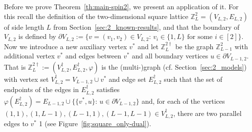 \documentclass{dis}
\theoremstyle{citing}
\begin{document}
Before we prove Theorem~\ref{th:main-spin2}, we present an 
application of it.
For this recall the definition of the two-dimensional 
square lattice ${\ensuremath{\mathbb{Z}}}_L^2=(V_{L,2},E_{L,2})$ of side length $L$ 
from Section~\ref{sec:2_known-results}, 
and that the boundary of $V_{L,2}$ is defined by 
$\partial V_{L,2} := \bigl\{v=(v_1,v_2)\in V_{L,2}:\, 
v_i\in\{1,L\} \text{ for some } i\in[2]\bigr\}$. 
Now we introduce a new auxiliary vertex $v^*$ and 
let ${\ensuremath{\mathbb{Z}}}_L^{2\dag}$ be the graph ${\ensuremath{\mathbb{Z}}}_{L-1}^2$ with additional 
vertex $v^*$ and edges between $v^*$ and all boundary vertices 
$u\in\partial V_{L-1,2}$.
That is ${\ensuremath{\mathbb{Z}}}_L^{2\dag}:=(V_{L,2}^\dag,E_{L,2}^\dag,\varphi)$ 
is the (multi-)graph (cf. Section~\ref{sec:2_models}) with 
vertex set $V_{L,2}^\dag=V_{L-1,2}\cup v^*$ and edge set 
$E_{L,2}^\dag$ such that
the set of endpoints of the edges in $E_{L,2}^\dag$ satisfies 
$\varphi(E_{L,2}^\dag)=
E_{L-1,2}\cup\{\{v^*,u\}:\,u\in\partial V_{L-1,2}\}$ 
and, 
for each of the vertices 
$(1,1), (1,L-1), (L-1,1), (L-1,L-1)\in V_{L,2}^\dag$, 
there are two parallel edges to $v^*$ \setcounter{figure}1
(see Figure~\ref{fig:square_only-dual}).
\end{document}

